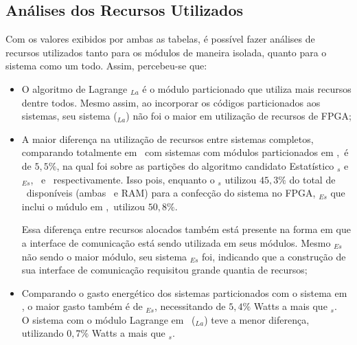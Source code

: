         \subsection{Análises dos Recursos Utilizados}
    
            Com os valores exibidos por ambas as tabelas, é possível fazer análises de recursos utilizados tanto para os módulos de maneira isolada, quanto para o sistema como um todo.
            Assim, percebeu-se que:
    
    
            
            \begin{itemize}
                \item 
                O algoritmo de Lagrange \A$_{La}$ é o módulo particionado que utiliza mais recursos dentre todos.
                Mesmo assim, ao incorporar os códigos particionados aos sistemas, seu sistema (\Ss$_{La}$) não foi o maior em utilização de recursos de FPGA;
                
                \item
                A maior diferença na utilização de recursos entre sistemas completos, comparando totalmente em \software\ com sistemas com módulos particionados em \hardware,\ é de $5,5\%$, na qual foi sobre as partições do algoritmo candidato Estatístico \Ss$_{s}$ e \Ss$_{Es}$, \software\ e \hardware\ respectivamente. 
                Isso pois, enquanto o \Ss$_{s}$ utilizou $45,3\%$ do total de \luts\ disponíveis (ambas \luts\ e \luts RAM) para a confecção do sistema no FPGA, \Ss$_{Es}$ que inclui o múdulo em \hardware,\ utilizou $50,8\%$.
                
                Essa diferença entre recursos alocados também está presente na forma em que a interface de comunicação está sendo utilizada em seus módulos.
                Mesmo \A$_{Es}$ não sendo o maior módulo, seu sistema \Ss$_{Es}$ foi, indicando que a construção de sua interface de comunicação requisitou grande quantia de recursos;
                
                \item
                Comparando o gasto energético dos sistemas particionados com o sistema em \software, o maior gasto também é de \Ss$_{Es}$, necessitando de $5,4\%$ Watts a mais que \Ss$_{s}$. \\
                O sistema com o módulo Lagrange em \hardware\ (\Ss$_{La}$) teve a menor diferença, utilizando $0,7\%$ Watts a mais que \Ss$_{s}$.
            \end{itemize}
               
